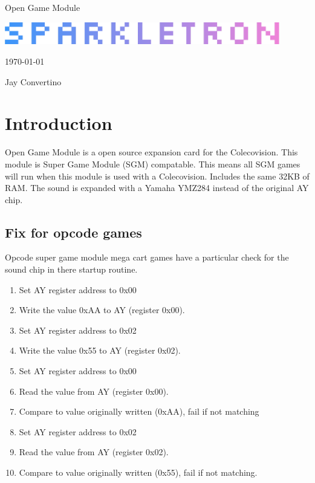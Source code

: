 \begin{titlepage}
  \begin{center}

  {\Huge Open Game Module}

  \vspace{25mm}

  \includegraphics[width=0.90\textwidth,height=\textheight,keepaspectratio]{img/SPARKLETRON.png}

  \vspace{25mm}

  \today

  \vspace{15mm}

  {\Large Jay Convertino}

  \end{center}
\end{titlepage}

\tableofcontents

\newpage

\section{Introduction}

\par
Open Game Module is a open source expansion card for the Colecovision. This module is Super Game Module (SGM) compatable.
This means all SGM games will run when this module is used with a Colecovision. Includes the same 32KB of RAM. The sound
is expanded with a Yamaha YMZ284 instead of the original AY chip.

\subsection{Fix for opcode games}

Opcode super game module mega cart games have a particular check for the sound chip in there startup routine.

\begin{enumerate}
  \item Set AY register address to 0x00
  \item Write the value 0xAA to AY (register 0x00).
  \item Set AY register address to 0x02
  \item Write the value 0x55 to AY (register 0x02).
  \item Set AY register address to 0x00
  \item Read the value from AY (register 0x00).
  \item Compare to value originally written (0xAA), fail if not matching
  \item Set AY register address to 0x02
  \item Read the value from AY (register 0x02).
  \item Compare to value originally written (0x55), fail if not matching.
\end{enumerate}

